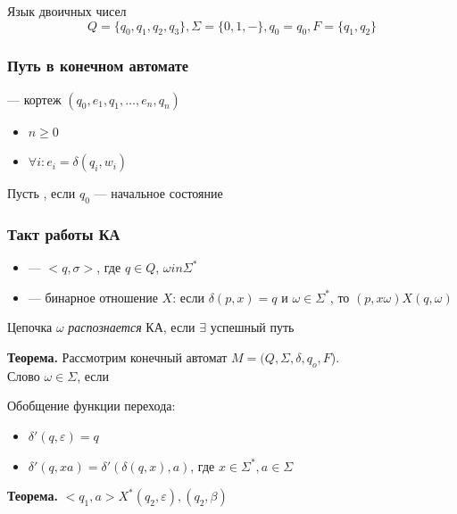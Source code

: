 \documentclass[a4paper, 14pt]{extarticle}
\begin{document}
\begin{example}{Язык двоичных чисел}
    \[ Q = \{q_0, q_1, q_2, q_3\}, \Sigma = \{ 0, 1, - \}, q_0 = q_0, F = \{ q_1, q_2 \} \]


\end{example}

\subsubsection*{Путь в конечном автомате}
 --- кортеж $(q_0, e_1, q_1, \ldots, e_n, q_n)$
\begin{itemize}
    \item $n \ge 0$
    \item $\forall i: e_i = \delta(q_i, w_i)$
\end{itemize}
Пусть , если $q_0$ --- начальное состояние

\subsubsection*{Такт работы КА}
\begin{itemize}
    \item {} --- $<q, \sigma>$, где $q \in Q$, $\omega in \Sigma^*$
    \item {} --- бинарное отношение $X$: если $\delta(p, x) = q$ и $\omega \in \Sigma^*$, то $ (p, x\omega) X (q, \omega) $ %
\end{itemize}
Цепочка $\omega$ \textit{распознается} КА, если $\exists$ успешный путь

\begin{tcolorbox}
    \textbf{Теорема.} Рассмотрим конечный автомат $M = (Q, \Sigma, \delta, q_o, F$).\\
    Слово $\omega \in \Sigma$, если %
\end{tcolorbox}

Обобщение функции перехода:
\begin{itemize}
    \item $\delta'(q, \varepsilon) = q$
    \item $\delta'(q, xa) = \delta'(\delta(q, x), a)$, где $x \in \Sigma^*, a \in \Sigma $
\end{itemize}

\begin{tcolorbox}
    \textbf{Теорема.} $<q_1, a> X^* (q_2, \varepsilon), (q_2, \beta) $ %
\end{tcolorbox}
\end{document}
